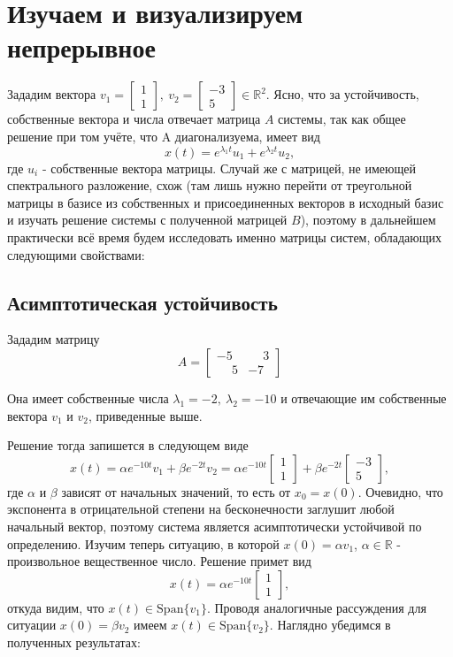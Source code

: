 \documentclass[a4paper,14pt]{extarticle}
\newcommand{\Span}{\text{Span}}
\begin{document}
	\section{Изучаем и визуализируем непрерывное}
	Зададим вектора 
	$v_1 = 
	\begin{bmatrix}
		1 \\
		1
	\end{bmatrix}, \
	v_2 =
	\begin{bmatrix}
		-3 \\
		5
	\end{bmatrix} \in \mathbb{R}^2$.
	Ясно, что за устойчивость, собственные вектора и числа отвечает матрица $A$ системы, так как общее решение при том учёте, что A диагонализуема, имеет вид
	\[
	x(t) = e^{\lambda_1t}u_1 + e^{\lambda_2t}u_2,
	\]
	где $u_i$ - собственные вектора матрицы. Случай же с матрицей, не имеющей спектрального разложение, схож (там лишь нужно перейти от треугольной матрицы в базисе из собственных и присоединенных векторов в исходный базис и изучать решение системы с полученной матрицей $B$), поэтому в дальнейшем практически всё время будем исследовать именно матрицы систем, обладающих следующими свойствами:
	\subsection{Асимптотическая устойчивость}
	Зададим матрицу
	\[A = 
	\begin{bmatrix}
		-5 & \phantom{-}3 \\
		\phantom{-}5  & -7
	\end{bmatrix}
	\]
	
	Она имеет собственные числа $\lambda_1 = -2,\ \lambda_2 = -10$ и отвечающие им собственные вектора $v_1$ и $v_2$, приведенные выше.
	
	Решение тогда запишется в следующем виде 
	\[
	x(t) = 
	\alpha e^{-10t} v_1 + \beta e^{-2t} v_2
	=
	 \alpha e^{-10t}
	\begin{bmatrix}
		1 \\ 1
	\end{bmatrix}
	+ \beta e^{-2t}
	\begin{bmatrix}
		-3 \\ 5
	\end{bmatrix}
	,
	\]
	где $\alpha \text{ и } \beta$ зависят от начальных значений, то есть от $x_0 = x(0)$.
	Очевидно, что экспонента в отрицательной степени на бесконечности заглушит любой начальный вектор, поэтому система является асимптотически устойчивой по определению. Изучим теперь ситуацию, в которой $x(0) = \alpha v_1$, $\alpha \in \mathbb{R}$ - произвольное вещественное число. Решение примет вид
	\[
	x(t) = \alpha e^{-10t}
	\begin{bmatrix}
		1 \\ 1
	\end{bmatrix},
	\]
	откуда видим, что $x(t) \in \Span \{v_1\}$. Проводя аналогичные рассуждения для ситуации $x(0) = \beta v_2$ имеем $x(t) \in \Span \{v_2\}$. Наглядно убедимся в полученных результатах:
	
\end{document}
